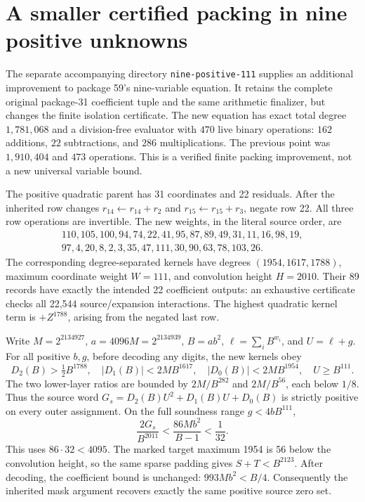 \section{A smaller certified packing in nine positive unknowns}
\label{sec:packing111}

The separate accompanying directory \texttt{nine-positive-111} supplies an
additional improvement to package 59's nine-variable equation. It retains
the complete original package-31 coefficient tuple and the same arithmetic
finalizer, but changes the finite isolation certificate. The new equation
has exact total degree \(1{,}781{,}068\) and a division-free evaluator with
\(470\) live binary operations: \(162\) additions, \(22\) subtractions,
and \(286\) multiplications. The previous point was
\(1{,}910{,}404\) and \(473\) operations. This is a verified finite
packing improvement, not a new universal variable bound.

The positive quadratic parent has 31 coordinates and 22 residuals. After
the inherited row changes \(r_{14}\leftarrow r_{14}+r_2\) and
\(r_{15}\leftarrow r_{15}+r_3\), negate row 22. All three row operations
are invertible. The new weights, in the literal source order, are
\[
\begin{gathered}
110,105,100,94,74,22,41,95,87,89,49,31,11,16,98,19,\\
97,4,20,8,2,3,35,47,111,30,90,63,78,103,26.
\end{gathered}
\]
The corresponding degree-separated kernels have degrees
\((1954,1617,1788)\), maximum coordinate weight \(W=111\), and
convolution height \(H=2010\). Their 89 records have exactly the intended
22 coefficient outputs: an exhaustive certificate checks all 22,544
source/expansion interactions. The highest quadratic kernel term is
\(+Z^{1788}\), arising from the negated last row.

Write \(M=2^{2134927}\), \(a=4096M=2^{2134939}\),
\(B=ab^2\), \(\ell=\sum_i B^{w_i}\), and \(U=\ell+g\).
For all positive \(b,g\), before decoding any digits, the new kernels obey
\[
D_2(B)>\tfrac12 B^{1788},\quad
|D_1(B)|<2MB^{1617},\quad |D_0(B)|<2MB^{1954},
\quad U\ge B^{111}.
\]
The two lower-layer ratios are bounded by \(2M/B^{282}\) and
\(2M/B^{56}\), each below \(1/8\). Thus the source word
\(G_s=D_2(B)U^2+D_1(B)U+D_0(B)\) is strictly positive on every outer
assignment. On the full soundness range \(g<4bB^{111}\),
\[
\frac{2G_s}{B^{2011}}<\frac{86Mb^2}{B-1}<\frac1{32}.
\]
This uses \(86\cdot32<4095\). The marked target maximum 1954 is 56 below
the convolution height, so the same sparse padding gives
\(S+T<B^{2123}\). After decoding, the coefficient bound is unchanged:
\(993Mb^2<B/4\). Consequently the inherited mask argument recovers exactly
the same positive source zero set.

